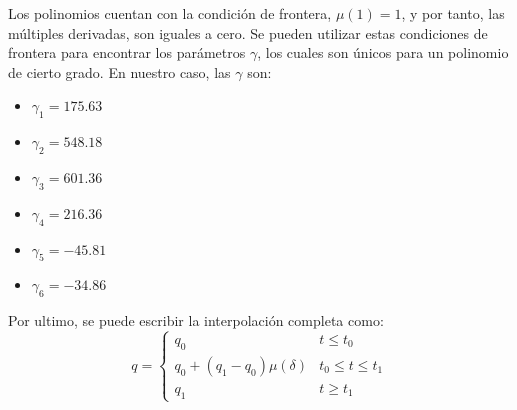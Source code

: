 Los polinomios cuentan con la condición de frontera, $\mu(1) = 1$, y por tanto, las múltiples derivadas, son iguales a cero. Se pueden utilizar estas condiciones de frontera para encontrar los parámetros $\gamma$, los cuales son únicos para un polinomio de cierto grado. En nuestro caso, las $\gamma$ son:
\begin{itemize}
    \item $\gamma_1 = 175.63$
    \item $\gamma_2 = 548.18$
    \item $\gamma_3 = 601.36$
    \item $\gamma_4 = 216.36$
    \item $\gamma_5 = -45.81$
    \item $\gamma_6 = -34.86$
\end{itemize}
Por ultimo, se puede escribir la interpolación completa como:
\[
    q = \left\{
    \begin{array}{ll}
        q_0 & t \leq t_0 \\
        q_0+(q_1-q_0)\mu(\delta) & t_0\leq t \leq t_1 \\
        q_1 & t \geq t_1
        \end{array}
        \right.
\]

